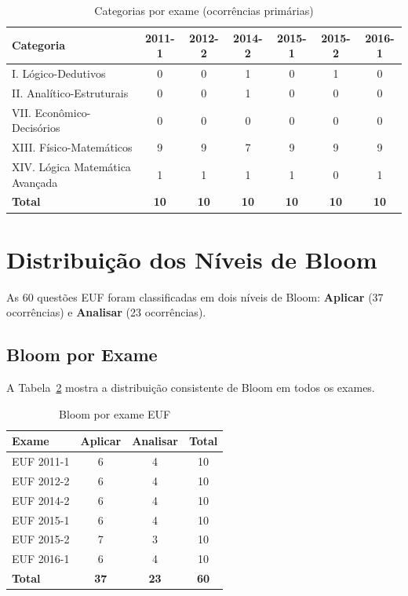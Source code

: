\documentclass[12pt,a4paper]{article}
\newcommand{\bloom}[1]{\textcolor{verdeexame}{\textbf{#1}}}
\begin{document}
\begin{table}[H]
\centering
\caption{Categorias por exame (ocorrências primárias)}
\label{tab:cat_por_exame}
\begin{tabular}{lcccccc}
\toprule
\textbf{Categoria} & \textbf{2011-1} & \textbf{2012-2} & \textbf{2014-2} & \textbf{2015-1} & \textbf{2015-2} & \textbf{2016-1} \\
\midrule
I. Lógico-Dedutivos & 0 & 0 & 1 & 0 & 1 & 0 \\
II. Analítico-Estruturais & 0 & 0 & 1 & 0 & 0 & 0 \\
VII. Econômico-Decisórios & 0 & 0 & 0 & 0 & 0 & 0 \\
XIII. Físico-Matemáticos & 9 & 9 & 7 & 9 & 9 & 9 \\
XIV. Lógica Matemática Avançada & 1 & 1 & 1 & 1 & 0 & 1 \\
\midrule
\textbf{Total} & \textbf{10} & \textbf{10} & \textbf{10} & \textbf{10} & \textbf{10} & \textbf{10} \\
\bottomrule
\end{tabular}
\end{table}

\section{Distribuição dos Níveis de Bloom}

As 60 questões EUF foram classificadas em dois níveis de Bloom:
\bloom{Aplicar} (37 ocorrências) e \bloom{Analisar} (23 ocorrências).

\subsection{Bloom por Exame}

A Tabela~\ref{tab:bloom_exame} mostra a distribuição consistente de
Bloom em todos os exames.

\begin{table}[H]
\centering
\caption{Bloom por exame EUF}
\label{tab:bloom_exame}
\begin{tabular}{lccc}
\toprule
\textbf{Exame} & \textbf{Aplicar} & \textbf{Analisar} & \textbf{Total} \\
\midrule
EUF 2011-1 & 6 & 4 & 10 \\
EUF 2012-2 & 6 & 4 & 10 \\
EUF 2014-2 & 6 & 4 & 10 \\
EUF 2015-1 & 6 & 4 & 10 \\
EUF 2015-2 & 7 & 3 & 10 \\
EUF 2016-1 & 6 & 4 & 10 \\
\midrule
\textbf{Total} & \textbf{37} & \textbf{23} & \textbf{60} \\
\bottomrule
\end{tabular}
\end{table}
\end{document}
